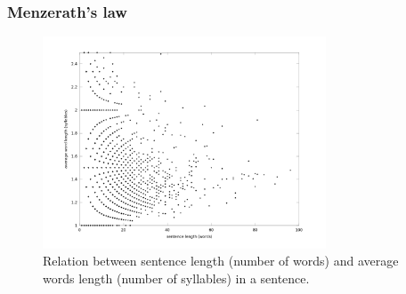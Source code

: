 \documentclass[notes]{beamer}
\begin{document}
\frame
{
  \frametitle{Menzerath's law}
  \vspace{-0.3cm}
  \begin{figure}[h]
  \centering
  \includegraphics[width=0.75\textwidth]{images/ulysses_words_sentence_word_length_syllables_z100.png}
  \caption{Relation between sentence length (number of words) and average words length (number of syllables) in a sentence.}
  \label{fig:ulysses_words_sentence_word_length}
  \end{figure}
}
\end{document}
